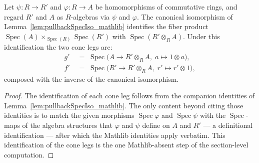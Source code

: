 \begin{lemma}



  \label{lem:pullback_fst_snd_specMap_tensor}
  Let \(\psi : R \to R'\) and \(\varphi : R \to A\) be homomorphisms of commutative
  rings, and regard \(R'\) and \(A\) as \(R\)-algebras via \(\psi\) and \(\varphi\).
  The canonical isomorphism of Lemma~\ref{lem:pullbackSpecIso_mathlib} identifies the
  fiber product \(\operatorname{Spec}(A) \times_{\operatorname{Spec}(R)}
  \operatorname{Spec}(R')\) with \(\operatorname{Spec}(R' \otimes_R A)\). Under this
  identification the two cone legs are:
  \begin{align*}
    g' &\;=\; \operatorname{Spec}\bigl(A \to R' \otimes_R A,\; a \mapsto 1 \otimes a\bigr),\\
    f' &\;=\; \operatorname{Spec}\bigl(R' \to R' \otimes_R A,\; r' \mapsto r' \otimes 1\bigr),
  \end{align*}
  composed with the inverse of the canonical isomorphism.
\end{lemma}

\begin{proof}
  The identification of each cone leg follows from the companion identities of
  Lemma~\ref{lem:pullbackSpecIso_mathlib}. The only content beyond citing those
  identities is to match the given morphisms \(\operatorname{Spec}\varphi\) and
  \(\operatorname{Spec}\psi\) with the \(\operatorname{Spec}\)-maps of the algebra
  structures that \(\varphi\) and \(\psi\) define on \(A\) and \(R'\) — a definitional
  identification — after which the Mathlib identities apply verbatim. This identification
  of the cone legs is the one Mathlib-absent step of the section-level computation.
\end{proof}


